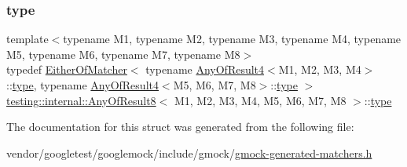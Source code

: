 \subsubsection{\texorpdfstring{type}{type}}
{\footnotesize\ttfamily template$<$typename M1, typename M2, typename M3, typename M4, typename M5, typename M6, typename M7, typename M8$>$ \\
typedef \hyperlink{classtesting_1_1internal_1_1_either_of_matcher}{Either\+Of\+Matcher}$<$ typename \hyperlink{structtesting_1_1internal_1_1_any_of_result4}{Any\+Of\+Result4}$<$M1, M2, M3, M4$>$\+::\hyperlink{structtesting_1_1internal_1_1_any_of_result8_a8f8a1e78a019965c24bd22c78885747d}{type}, typename \hyperlink{structtesting_1_1internal_1_1_any_of_result4}{Any\+Of\+Result4}$<$M5, M6, M7, M8$>$\+::\hyperlink{structtesting_1_1internal_1_1_any_of_result8_a8f8a1e78a019965c24bd22c78885747d}{type} $>$ \hyperlink{structtesting_1_1internal_1_1_any_of_result8}{testing\+::internal\+::\+Any\+Of\+Result8}$<$ M1, M2, M3, M4, M5, M6, M7, M8 $>$\+::\hyperlink{structtesting_1_1internal_1_1_any_of_result8_a8f8a1e78a019965c24bd22c78885747d}{type}}



The documentation for this struct was generated from the following file\+:\begin{DoxyCompactItemize}
\item 
vendor/googletest/googlemock/include/gmock/\hyperlink{gmock-generated-matchers_8h}{gmock-\/generated-\/matchers.\+h}\end{DoxyCompactItemize}
